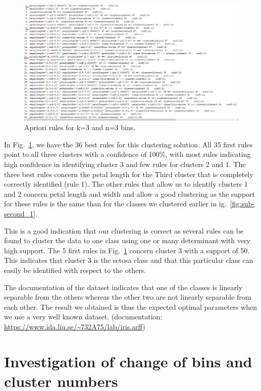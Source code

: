 \documentclass[letterpaper,12pt]{article}
\begin{document}
\begin{figure}[H] 
  \centering
      \includegraphics[width=0.8\columnwidth]{3_bins_3cl_apriori_rules}
        \caption{
                \label{fig:3bins_3cl_apriori}  
                Apriori rules for k=3 and n=3 bins.
        }
\end{figure}

In Fig.~\ref{fig:3bins_3cl_apriori}, we have the 36 best rules for this clustering solution. All 35 first rules point to all three clusters with a confidence of 100\%, with most rules indicating high confidence in identifying cluster 3 and few rules for clusters 2 and 1. The three best rules concern the petal length  for the Third cluster that is completely correctly identified (rule 1). The other rules that allow us to identify clusters 1 and 2 concern petal length and width and allow a good clustering as the support for these rules is the same than for the classes we clustered earlier in ig.~\ref{fig:sub-second_1}.

This is a good indication that our clustering is correct as several rules can be found to cluster the data to one class using one or many determinant with very high support. The 5 first rules in Fig.~\ref{fig:3bins_3cl_apriori} concern cluster 3 with a support of 50. This indicates that cluster 3 is the setosa class and that this particular class can easily be identified with respect to the others.

The documentation of the dataset indicates that one of the classes is linearly separable from the others whereas the other two are not linearly separable from each other. The result we obtained is thus the expected optimal parameters when we use a very well known dataset. (documentation: \url{https://www.ida.liu.se/~732A75/lab/iris.arff})

\section{Investigation of change of bins and cluster numbers}
\end{document}
